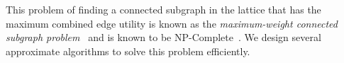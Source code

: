 This problem of finding a connected subgraph in the lattice that has the maximum combined edge utility is known as the \emph{maximum-weight connected subgraph problem}~\cite{ErnstAlthaus2009} and is known to be NP-Complete~\cite{Parameswaran2010}. We design several approximate algorithms to solve this problem efficiently. 
